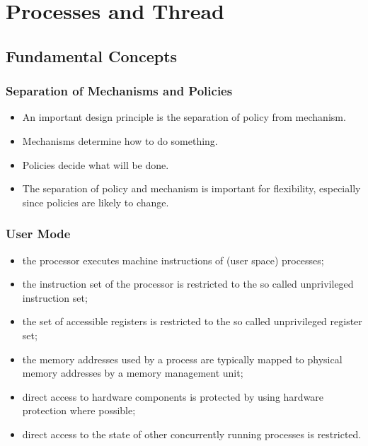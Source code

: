 \documentclass[11pt]{article}
\begin{document}
\section{Processes and Thread}
\label{sec:org1b06491}
\subsection{Fundamental Concepts}
\label{sec:orgf7ea0a7}
\subsubsection{Separation of Mechanisms and Policies}
\label{sec:org4c30b8a}
\begin{itemize}
\item An important design principle is the separation of policy from mechanism.
\item Mechanisms determine how to do something.
\item Policies decide what will be done.
\item The separation of policy and mechanism is important for flexibility, especially since policies are likely to change.
\end{itemize}
\subsubsection{User Mode}
\label{sec:org6996b62}
\begin{itemize}
\item the processor executes machine instructions of (user space) processes;
\item the instruction set of the processor is restricted to the so called unprivileged instruction set;
\item the set of accessible registers is restricted to the so called unprivileged register set;
\item the memory addresses used by a process are typically mapped to physical memory addresses by a memory management unit;
\item direct access to hardware components is protected by using hardware protection where possible;
\item direct access to the state of other concurrently running processes is restricted.
\end{itemize}
\end{document}
